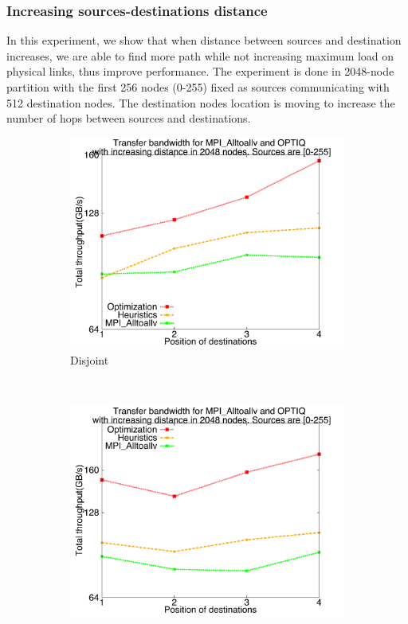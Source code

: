 \subsubsection{Increasing sources-destinations distance}

In this experiment, we show that when distance between sources and destination increases, we are able to find more path while not increasing maximum load on physical links, thus improve performance. The experiment is done in 2048-node partition with the first 256 nodes (0-255) fixed as sources communicating with 512 destination nodes. The destination nodes location is moving to increase the number of hops between sources and destinations.

\begin{figure}[!htbp]
        \centering
        \begin{subfigure}[b]{0.32\textwidth}
                \includegraphics[width=\textwidth]{figures/incrdist_disjoint.pdf}
                \caption{Disjoint}
                \label{fig:incrdist_disjoint}
        \end{subfigure}%
        ~ %
        \begin{subfigure}[b]{0.32\textwidth}
                \includegraphics[width=\textwidth]{figures/incrdist_overlap}

\end{subfigure}
\end{figure}
